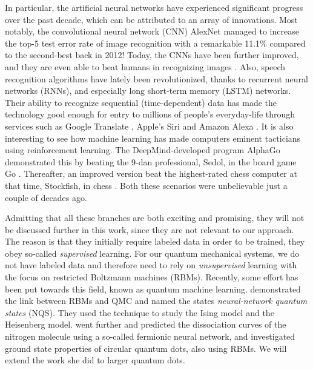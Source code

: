 In particular, the artificial neural networks have experienced significant progress over the past decade, which can be attributed to an array of innovations. Most notably, the convolutional neural network (CNN) AlexNet \supercite{krizhevsky_imagenet_2012} managed to increase the top-5 test error rate of image recognition with a remarkable 11.1\% compared to the second-best back in 2012! Today, the CNNs have been further improved, and they are even able to beat humans in recognizing images \supercite{alom_history_2018}. Also, speech recognition algorithms have lately been revolutionized, thanks to recurrent neural networks (RNNs), and especially long short-term memory (LSTM) networks. Their ability to recognize sequential (time-dependent) data has made the technology good enough for entry to millions of people's everyday-life through services such as Google Translate \supercite{wu_googles_2016}, Apple's Siri \supercite{smith_ios_2016} and Amazon Alexa \supercite{noauthor_bringing_nodate}. It is also interesting to see how machine learning has made computers eminent tacticians using reinforcement learning. The DeepMind-developed program AlphaGo demonstrated this by beating the 9-dan professional, Sedol, in the board game Go \supercite{silver2016mastering}. Thereafter, an improved version beat the highest-rated chess computer at that time, Stockfish, in chess \supercite{silver2017mastering}. Both these scenarios were unbelievable just a couple of decades ago.

Admitting that all these branches are both exciting and promising, they will not be discussed further in this work, since they are not relevant to our approach. The reason is that they initially require labeled data in order to be trained, they obey so-called \textit{supervised} learning. For our quantum mechanical systems, we do not have labeled data and therefore need to rely on \textit{unsupervised} learning with the focus on restricted Boltzmann machines (RBMs). Recently, some effort has been put towards this field, known as quantum machine learning. \citet{carleo_solving_2017} demonstrated the link between RBMs and QMC and named the states \textit{neural-network quantum states} (NQS). They used the technique to study the Ising model and the Heisenberg model. \citet{pfau2019abinitio} went further and predicted the dissociation curves of the nitrogen molecule using a so-called fermionic neural network, and \citet{flugsrud_vilde_moe_solving_nodate} investigated ground state properties of circular quantum dots, also using RBMs. We will extend the work she did to larger quantum dots.

